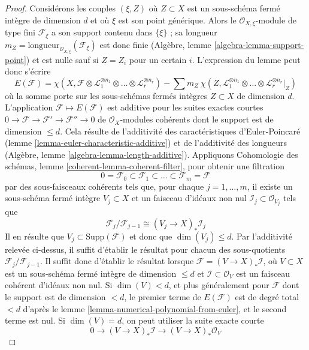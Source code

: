 \begin{proof}
Considérons les couples $(\xi , Z)$ où $Z \subset X$ est un
sous-schéma fermé intègre de dimension $d$ et où $\xi$ est son point générique.
Alors le $\mathcal{O}_{X, \xi}$-module de type fini $\mathcal{F}_\xi$
a son support contenu dans $\{\xi\}$ ; sa longueur
$m_Z = \text{longueur}_{\mathcal{O}_{X, \xi}}(\mathcal{F}_\xi)$
est donc finie (Algèbre, lemme \ref{algebra-lemma-support-point})
et est nulle sauf si $Z = Z_i$ pour un certain $i$. L'expression
du lemme peut donc s'écrire
$$
E(\mathcal{F}) =
\chi(X, \mathcal{F} \otimes \mathcal{L}_1^{\otimes n_1} \otimes \ldots \otimes
\mathcal{L}_r^{\otimes n_r}) -
\sum\nolimits
m_Z\ \chi(Z, \mathcal{L}_1^{\otimes n_1} \otimes \ldots \otimes
\mathcal{L}_r^{\otimes n_r}|_Z)
$$
où la somme porte sur les sous-schémas fermés intègres $Z \subset X$
de dimension $d$. L'application $\mathcal{F} \mapsto E(\mathcal{F})$
est additive pour les suites exactes courtes
$0 \to \mathcal{F} \to \mathcal{F}' \to \mathcal{F}'' \to 0$
de $\mathcal{O}_X$-modules cohérents dont le support est de dimension
$\leq d$. Cela résulte de l'additivité des caractéristiques d'Euler-Poincaré
(lemme \ref{lemma-euler-characteristic-additive})
et de l'additivité des longueurs
(Algèbre, lemme \ref{algebra-lemma-length-additive}).
Appliquons Cohomologie des schémas, lemme \ref{coherent-lemma-coherent-filter},
pour obtenir une filtration
$$
0 = \mathcal{F}_0 \subset \mathcal{F}_1 \subset
\ldots \subset \mathcal{F}_m = \mathcal{F}
$$
par des sous-faisceaux cohérents tels que, pour chaque $j = 1, \ldots, m$,
il existe un sous-schéma fermé intègre $V_j \subset X$
et un faisceau d'idéaux non nul $\mathcal{I}_j \subset \mathcal{O}_{V_j}$
tels que
$$
\mathcal{F}_j/\mathcal{F}_{j - 1}
\cong (V_j \to X)_* \mathcal{I}_j
$$
Il en résulte que $V_j \subset \text{Supp}(\mathcal{F})$ et
donc que $\dim(V_j) \leq d$.
Par l'additivité relevée ci-dessus, il suffit
d'établir le résultat pour chacun des sous-quotients
$\mathcal{F}_j/\mathcal{F}_{j - 1}$. Il suffit donc d'établir
le résultat lorsque $\mathcal{F} = (V \to X)_*\mathcal{I}$, où
$V \subset X$ est un sous-schéma fermé intègre de dimension $\leq d$
et $\mathcal{I} \subset \mathcal{O}_V$ est un faisceau cohérent
d'idéaux non nul. Si $\dim(V) < d$, et plus généralement pour $\mathcal{F}$
dont le support est de dimension $< d$, le premier terme
de $E(\mathcal{F})$ est de degré total $< d$ d'après le
lemme \ref{lemma-numerical-polynomial-from-euler},
et le second terme est nul. Si $\dim(V) = d$, on peut utiliser la
suite exacte courte
$$
0 \to (V \to X)_*\mathcal{I} \to (V \to X)_*\mathcal{O}_V
$$
\end{proof}
